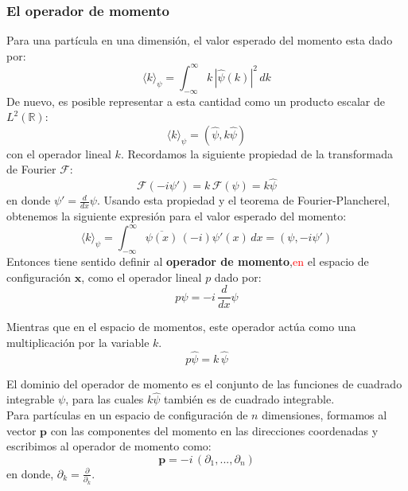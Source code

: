 \documentclass[12pt]{book}
\numberwithin{equation}{chapter}
\def\ol{\overline}
\def\R{\mathbb{R}}
\def\la{\langle}
\def\ra{\rangle}
\def\F{\mathcal{F}}
\def\x{\mathbf{x}}
\def\P{\mathbf{p}}
\begin{document}
\subsubsection{El operador de momento}
Para una part\'icula en una dimensi\'on, el valor esperado del momento esta dado por:
\begin{equation}
\la k \ra_{\psi} = \int_{-\infty}^{\infty} k\, |\hat{\psi}(k)|^{2}\, dk 
\end{equation}
De nuevo, es posible representar a esta cantidad como un producto escalar de $L^{2}(\R)$:
\begin{equation}\label{mom-k}
\la k \ra_{\psi} = (\hat{\psi} , k \hat{\psi})
\end{equation}
con el operador lineal $k$. Recordamos la siguiente propiedad de la transformada de Fourier $\F$:
$$ \F (-i \psi' )= k \, \F (\psi) = k \hat{\psi} $$
en donde $\psi' = \frac{d}{dx} \psi$. Usando esta propiedad y el teorema de Fourier-Plancherel, obtenemos la siguiente expresi\'on para el valor esperado del momento:
\begin{equation}
\la k \ra_{\psi}= \int_{-\infty}^{\infty} \ol{\psi(x)} \, (-i)\psi'(x) \, dx = (\psi , -i \psi')
\end{equation}
Entonces tiene sentido definir al {\bf operador de momento},\textcolor{red}{en} el espacio de configuraci\'on $\x$, como el operador lineal $p$ dado por: 
\begin{equation}
p \psi = -i \, \frac{d}{dx} \psi
\end{equation}

Mientras que en el espacio de momentos, este operador act\'ua como una multiplicaci\'on por la variable $k$.
\begin{equation}
 p\hat{\psi}= k \, \hat{\psi} 
\end{equation}

El dominio del operador de momento es el conjunto de las funciones de cuadrado integrable $\psi$, para las cuales $k \hat{\psi}$ tambi\'en es de cuadrado integrable.\\

Para part\'iculas en un espacio de configuraci\'on de $n$ dimensiones, formamos al vector $\P$ con las componentes del momento en las direcciones coordenadas y escribimos al operador de momento como:
\begin{equation}
\P = -i \, ( \partial_{1},...,\partial_{n} )
\end{equation}
en donde, $\partial_{k} = \frac{\partial}{\partial_{k}} $.
\end{document}
